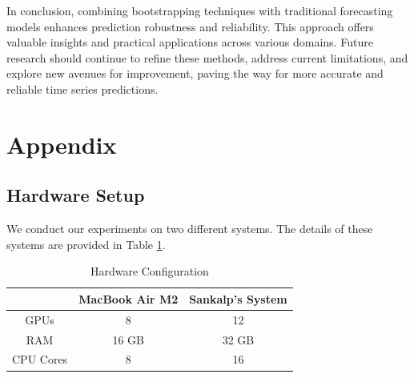 \documentclass{article}
\begin{document}
In conclusion, combining bootstrapping techniques with traditional forecasting models enhances prediction robustness and reliability. This approach offers valuable insights and practical applications across various domains. Future research should continue to refine these methods, address current limitations, and explore new avenues for improvement, paving the way for more accurate and reliable time series predictions.





\section{Appendix}

\subsection{Hardware Setup}
We conduct our experiments on two different systems. The details of these systems are provided in Table \ref{tab:hardware_setup}.

\begin{table}[h]
    \centering
    \caption{Hardware Configuration}
    \label{tab:hardware_setup}
    \begin{tabular}{c|cc}\toprule
         & MacBook Air M2 & Sankalp's System  \\ \midrule
         GPUs & 8 & 12 \\
         RAM & 16 GB & 32 GB \\
         CPU Cores & 8 & 16 \\
        \bottomrule
    \end{tabular}
\end{table}
\end{document}
